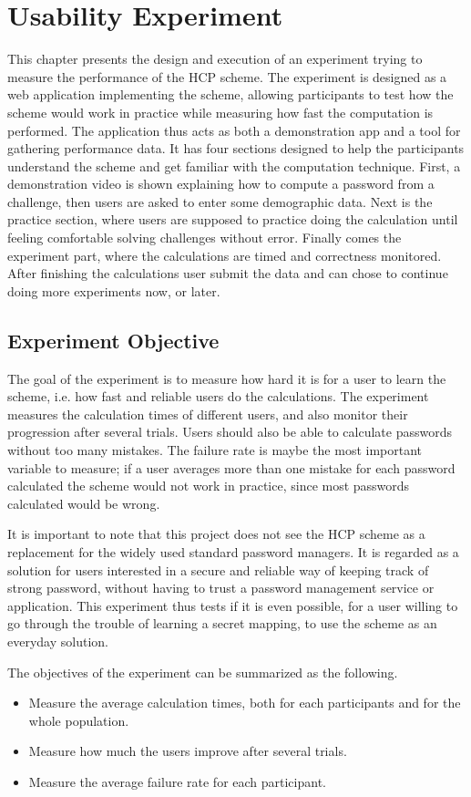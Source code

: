 \chapter{Usability Experiment}\label{ch:experiment}
This chapter presents the design and execution of an experiment trying to measure  the performance of the HCP scheme. The experiment is designed as a web application implementing the scheme, allowing participants to test how the scheme would work in practice while measuring how fast the computation is performed. The application thus acts as both a demonstration app and a tool for gathering performance data. It has four sections designed to help the participants understand the scheme and get familiar with the computation technique. First, a demonstration video is shown explaining how to compute a password from a challenge, then users are asked to enter some demographic data. Next is the practice section, where users are supposed to practice doing the calculation until feeling comfortable solving challenges without error. Finally comes the experiment part, where the calculations are timed and correctness monitored. After finishing the calculations user submit the data and can chose to continue doing more experiments now, or later.
\section{Experiment Objective}
The goal of the experiment is to measure how hard it is for a user to learn the scheme, i.e. how fast and reliable users do the calculations. The experiment measures the calculation times of different users, and also monitor their progression after several trials. Users should also be able to calculate passwords without too many mistakes. The failure rate is maybe the most important variable to measure; if a user averages more than one mistake for each password calculated the scheme would not work in practice, since most passwords calculated would be wrong. 
\par It is important to note that this project does not see the HCP scheme as a replacement for the widely used standard password managers. It is regarded as a solution for users interested in a secure and reliable way of keeping track of strong password, without having to trust a password management service or application. This experiment thus tests if it is even possible, for a user willing to go through the trouble of learning a secret mapping, to use the scheme as an everyday solution.

\par The objectives of the experiment can be summarized as the following.
\begin{itemize}
    \item Measure the average calculation times, both for each participants and for the whole population.
    \item Measure how much the users improve after several trials.
    \item Measure the average failure rate for each participant.
\end{itemize}


